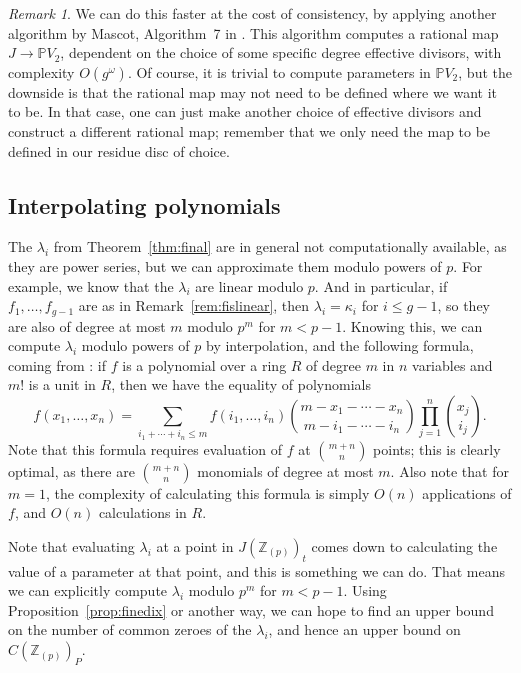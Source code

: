 \documentclass[12pt]{article}
\newcommand{\Z}{\mathbb{Z}}
\renewcommand{\P}{\mathbb{P}}
\theoremstyle{plain}
\theoremstyle{definition}
\theoremstyle{remark}
\newtheorem{rem}[thm]{Remark} %
\begin{document}
\begin{rem}
\label{rem:faster}
We can do this faster at the cost of consistency, by applying another algorithm by Mascot, Algorithm~7 in \cite{mascot18}. This algorithm computes a rational map $J \to \P V_2$, dependent on the choice of some specific degree effective divisors, with complexity $O(g^\omega)$. Of course, it is trivial to compute parameters in $\P V_2$, but the downside is that the rational map may not need to be defined where we want it to be. In that case, one can just make another choice of effective divisors and construct a different rational map; remember that we only need the map to be defined in our residue disc of choice.
\end{rem}

\subsection{Interpolating polynomials}
\label{subs:interpolate}
The $\lambda_i$ from Theorem~\ref{thm:final} are in general not computationally available, as they are power series, but we can approximate them modulo powers of $p$. For example, we know that the $\lambda_i$ are linear modulo $p$. And in particular, if $f_1,\dots,f_{g-1}$ are as in Remark~\ref{rem:fislinear}, then $\lambda_i = \kappa_i$ for $i \leq g-1$, so they are also of degree at most $m$ modulo $p^m$ for $m < p-1$. Knowing this, we can compute $\lambda_i$ modulo powers of $p$ by interpolation, and the following formula, coming from \cite{salzer}: if $f$ is a polynomial over a ring $R$ of degree $m$ in $n$ variables and $m!$ is a unit in $R$, then we have the equality of polynomials
\[
f(x_1,\dots,x_n) = \sum_{i_1 + \cdots + i_n \leq m} f(i_1,\dots,i_n) \binom{m-x_1-\cdots-x_n}{m-i_1-\cdots-i_n} \prod_{j=1}^n \binom{x_j}{i_j}.
\]
Note that this formula requires evaluation of $f$ at $\binom{m+n}{n}$ points; this is clearly optimal, as there are $\binom{m+n}{n}$ monomials of degree at most $m$. Also note that for $m=1$, the complexity of calculating this formula is simply $O(n)$ applications of $f$, and $O(n)$ calculations in $R$.

Note that evaluating $\lambda_i$ at a point in $J(\Z_{(p)})_t$ comes down to calculating the value of a parameter at that point, and this is something we can do. That means we can explicitly compute $\lambda_i$ modulo $p^m$ for $m < p-1$. Using Proposition~\ref{prop:finedix} or another way, we can hope to find an upper bound on the number of common zeroes of the $\lambda_i$, and hence an upper bound on $C(\Z_{(p)})_P$.
\end{document}
